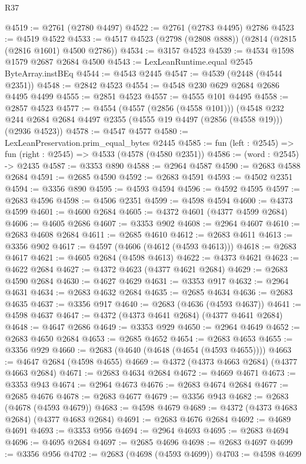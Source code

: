 \begin{lexlean}{R37}
\begin{coremodule}
@4519 := @2761 (@2780 @4497)
@4522 := @2761 (@2783 @4495) @2786
@4523 := @4519 @4522
@4533 := @4517 @4523 (@2798 (@2808 @888)) (@2814 (@2815 (@2816 @1601) @4500 @2786))
@4534 := @3157 @4523
@4539 := @4534 @1598 @1579 @2687 @2684 @4500
@4543 := LexLeanRuntime.equal @2545 ByteArray.instBEq
@4544 := @4543 @2445
@4547 := @4539 (@2448 (@4544 @2351))
@4548 := @2842 @4523
@4554 := @4548 @230 @629 @2684 @2686 @4495 @4499
@4555 := @2851 @4523
@4557 := @4555 @101 @4495
@4558 := @2857 @4523
@4577 := @4554
    (@4557 (@2856 (@4558 @101)))
    (@4548 @232 @244 @2684 @2684 @4497 @2355 (@4555 @19 @4497 (@2856 (@4558 @19))) (@2936 @4523))
@4578 := @4547 @4577
@4580 := LexLeanPreservation.prim_equal_bytes @2445
@4585 := fun (left : @2545) => fun (right : @2545) => @4533 (@4578 (@4580 @2351))
@4586 := (word : @2545) -> @2435
@4587 := @3353 @890
@4588 := @2964 @4587
@4590 := @2683 @4588 @2684
@4591 := @2685 @4590
@4592 := @2683 @4591
@4593 := @4502 @2351
@4594 := @3356 @890
@4595 := @4593 @4594
@4596 := @4592 @4595
@4597 := @2683 @4596
@4598 := @4506 @2351
@4599 := @4598 @4594
@4600 := @4373 @4599
@4601 := @4600 @2684
@4605 := @4372 @4601 (@4377 @4599 @2684)
@4606 := @4605 @2686
@4607 := @3353 @902
@4608 := @2964 @4607
@4610 := @2683 @4608 @2684
@4611 := @2685 @4610
@4612 := @2683 @4611
@4613 := @3356 @902
@4617 := @4597 (@4606 (@4612 (@4593 @4613)))
@4618 := @2683 @4617
@4621 := @4605 @2684 (@4598 @4613)
@4622 := @4373 @4621
@4623 := @4622 @2684
@4627 := @4372 @4623 (@4377 @4621 @2684)
@4629 := @2683 @4590 @2684
@4630 := @4627 @4629
@4631 := @3353 @917
@4632 := @2964 @4631
@4634 := @2683 @4632 @2684
@4635 := @2685 @4634
@4636 := @2683 @4635
@4637 := @3356 @917
@4640 := @2683 (@4636 (@4593 @4637))
@4641 := @4598 @4637
@4647 := @4372 (@4373 @4641 @2684) (@4377 @4641 @2684)
@4648 := @4647 @2686
@4649 := @3353 @929
@4650 := @2964 @4649
@4652 := @2683 @4650 @2684
@4653 := @2685 @4652
@4654 := @2683 @4653
@4655 := @3356 @929
@4660 := @2683 (@4640 (@4648 (@4654 (@4593 @4655))))
@4663 := @4647 @2684 (@4598 @4655)
@4669 := @4372 (@4373 @4663 @2684) (@4377 @4663 @2684)
@4671 := @2683 @4634 @2684
@4672 := @4669 @4671
@4673 := @3353 @943
@4674 := @2964 @4673
@4676 := @2683 @4674 @2684
@4677 := @2685 @4676
@4678 := @2683 @4677
@4679 := @3356 @943
@4682 := @2683 (@4678 (@4593 @4679))
@4683 := @4598 @4679
@4689 := @4372 (@4373 @4683 @2684) (@4377 @4683 @2684)
@4691 := @2683 @4676 @2684
@4692 := @4689 @4691
@4693 := @3353 @956
@4694 := @2964 @4693
@4695 := @2683 @4694
@4696 := @4695 @2684
@4697 := @2685 @4696
@4698 := @2683 @4697
@4699 := @3356 @956
@4702 := @2683 (@4698 (@4593 @4699))
@4703 := @4598 @4699

\end{coremodule}
\end{lexlean}
